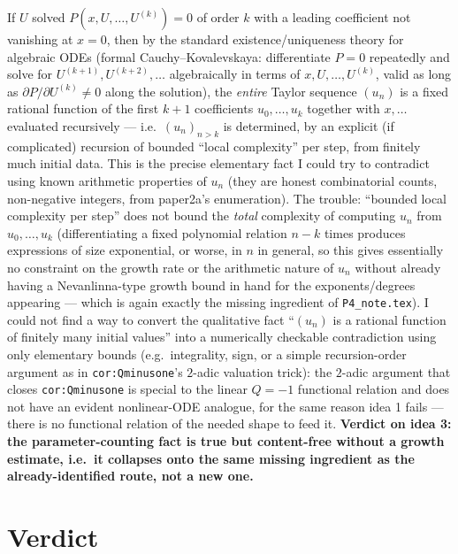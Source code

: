 \documentclass[11pt]{article}
\theoremstyle{remark}
\begin{document}
If $U$ solved $P(x,U,\ldots,U^{(k)})=0$ of order $k$ with a leading coefficient not vanishing at
$x=0$, then by the standard existence/uniqueness theory for algebraic ODEs (formal Cauchy--Kovalevskaya:
differentiate $P=0$ repeatedly and solve for $U^{(k+1)},U^{(k+2)},\ldots$ algebraically in terms of
$x,U,\ldots,U^{(k)}$, valid as long as $\partial P/\partial U^{(k)}\ne0$ along the solution), the
\emph{entire} Taylor sequence $(u_n)$ is a fixed rational function of the first $k+1$ coefficients
$u_0,\ldots,u_k$ together with $x,\ldots$ evaluated recursively --- i.e.\ $(u_n)_{n>k}$ is determined,
by an explicit (if complicated) recursion of bounded ``local complexity'' per step, from finitely much
initial data. This is the precise elementary fact I could try to contradict using known arithmetic
properties of $u_n$ (they are honest combinatorial counts, non-negative integers, from paper2a's
enumeration). The trouble: ``bounded local complexity per step'' does not bound the \emph{total}
complexity of computing $u_n$ from $u_0,\ldots,u_k$ (differentiating a fixed polynomial relation $n-k$
times produces expressions of size exponential, or worse, in $n$ in general, so this gives essentially
no constraint on the growth rate or the arithmetic nature of $u_n$ without already having a
Nevanlinna-type growth bound in hand for the exponents/degrees appearing --- which is again exactly
the missing ingredient of \texttt{P4\_note.tex}). I could not find a way to convert the qualitative
fact ``$(u_n)$ is a rational function of finitely many initial values'' into a numerically checkable
contradiction using only elementary bounds (e.g.\ integrality, sign, or a simple recursion-order
argument as in \texttt{cor:Qminusone}'s $2$-adic valuation trick): the $2$-adic argument that closes
\texttt{cor:Qminusone} is special to the linear $Q=-1$ functional relation and does not have an
evident nonlinear-ODE analogue, for the same reason idea 1 fails --- there is no functional relation
of the needed shape to feed it. \textbf{Verdict on idea 3: the parameter-counting fact is true but
content-free without a growth estimate, i.e.\ it collapses onto the same missing ingredient as the
already-identified route, not a new one.}

\section{Verdict}
\end{document}
